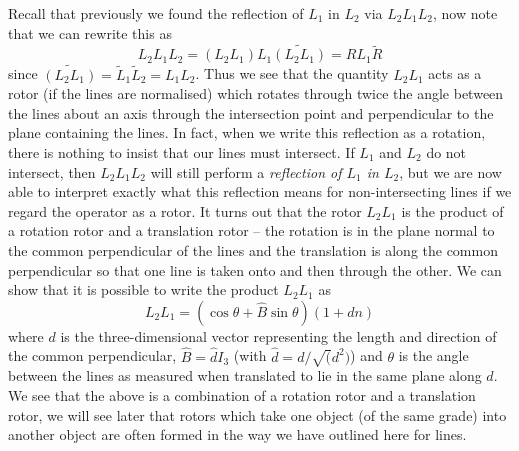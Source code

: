 Recall that
previously we found the reflection of $L_1$ in $L_2$ via
$L_2L_1L_2$, now note that we can rewrite this as
%
\begin{equation}
 L_2L_1L_2 = (L_2L_1)L_1\widetilde{(L_2L_1)} = RL_1\tilde{R}
\end{equation}
%
since $\widetilde{(L_2L_1)} = \tilde{L}_1\tilde{L}_2=L_1L_2$.
Thus we see that the quantity $L_2L_1$ acts as a rotor
(if the lines are normalised) which rotates through twice
the angle between the lines about an axis through the
intersection point and perpendicular to the plane
containing the lines. In fact, when we write this
reflection as a rotation, there is nothing to insist that
our lines must intersect. If $L_1$ and $L_2$ do not
intersect, then $L_2L_1L_2$ will still perform a {\em
reflection of $L_1$ in $L_2$}, but we are now able to
interpret exactly what this reflection means for
non-intersecting lines if we regard the operator as a
rotor. It turns out that the rotor $L_2L_1$ is the
product of a rotation rotor and a translation rotor --
the rotation is in the plane normal to the common
perpendicular of the lines and the translation is along
the common perpendicular so that one line is taken onto
and then through the other. We can show that it is
possible to write the product $L_2L_1$ as
%
\begin{equation}
L_2L_1 = (\cos{\theta} + \hat{B}\sin{\theta})(1 + dn)
\end{equation}
%
where $d$ is the three-dimensional vector representing the length and
direction of the common perpendicular, $\hat{B} =
\hat{d}I_3$ (with $\hat{d}=d/\sqrt(d^2)$) and  $\theta$
is the angle between the lines as measured when
translated to lie in the same plane along $d$. We see
that the above is a combination of a rotation rotor and a
translation rotor, we will see later that rotors which
take one object (of the same grade) into another object
are often formed in the way we have outlined here for
lines.


